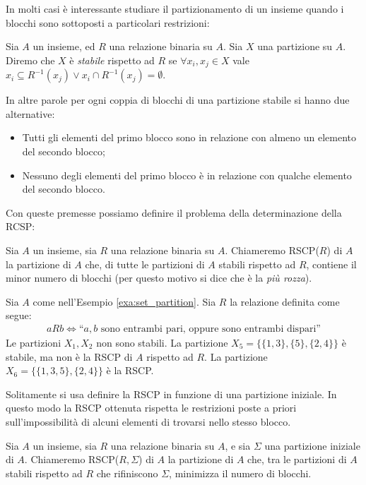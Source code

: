 In molti casi è interessante studiare il partizionamento di un insieme quando i blocchi sono sottoposti a particolari restrizioni:
\begin{definition}
    Sia $A$ un insieme, ed $R$ una relazione binaria su $A$. Sia $X$ una partizione su $A$. Diremo che $X$ è \emph{stabile} rispetto ad $R$ se $\forall x_i, x_j \in X$
    vale $x_i \subseteq R^{-1}(x_j) \lor x_i \cap R^{-1}(x_j) = \emptyset$.
\end{definition}
In altre parole per ogni coppia di blocchi di una partizione stabile si hanno due alternative:
\begin{itemize}
    \item Tutti gli elementi del primo blocco sono in relazione con almeno un elemento del secondo blocco;
    \item Nessuno degli elementi del primo blocco è in relazione con qualche elemento del secondo blocco.
\end{itemize}
Con queste premesse possiamo definire il problema della determinazione della RCSP:
\begin{definition}
    Sia $A$ un insieme, sia $R$ una relazione binaria su $A$. Chiameremo RSCP($R$) di $A$ la partizione di $A$ che, di tutte le partizioni di $A$ stabili rispetto ad $R$, contiene il minor numero di blocchi (per questo motivo si dice che è la \emph{più rozza}).
\end{definition}
\begin{example}
    Sia $A$ come nell'Esempio \ref{exa:set_partition}. Sia $R$ la relazione definita come segue:
    \begin{gather*}
        a R b \iff \text{``} a,b \text{ sono entrambi pari, oppure sono entrambi dispari''}
    \end{gather*}
    Le partizioni $X_1,X_2$ non sono stabili. La partizione $X_5 = \{\{1,3\},\{5\},\{2,4\}\}$ è stabile, ma non è la RSCP di $A$ rispetto ad $R$. La partizione
    $X_6 = \{\{1,3,5\},\{2,4\}\}$ è la RSCP.
\end{example}
Solitamente si usa definire la RSCP in funzione di una partizione iniziale. In questo modo la RSCP ottenuta rispetta le restrizioni poste a priori sull'impossibilità di alcuni elementi di trovarsi nello stesso blocco.
\begin{definition}
    Sia $A$ un insieme, sia $R$ una relazione binaria su $A$, e sia $\Sigma$ una partizione iniziale di $A$. Chiameremo RSCP($R,\Sigma$) di $A$ la partizione di $A$ che, tra le partizioni di $A$ stabili rispetto ad $R$ che rifiniscono $\Sigma$,
    minimizza il numero di blocchi.
\end{definition}
